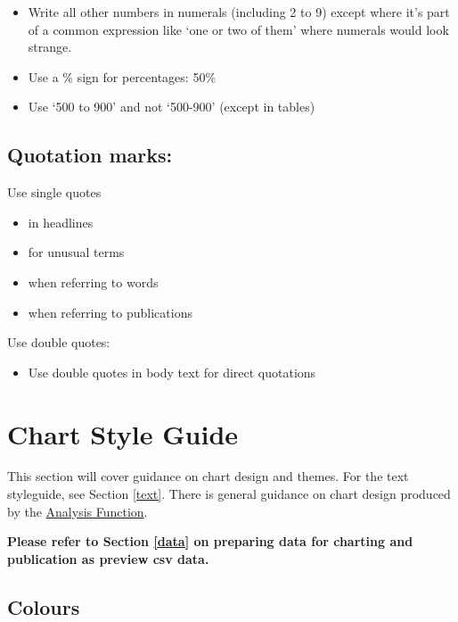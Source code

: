 \documentclass[
]{book}
\providecommand{\tightlist}{%
  \setlength{\itemsep}{0pt}\setlength{\parskip}{0pt}}
\begin{document}
\begin{itemize}
\tightlist
\item
  Write all other numbers in numerals (including 2 to 9) except where it's part of a common expression like `one or two of them' where numerals would look strange.
\item
  Use a \% sign for percentages: 50\%
\item
  Use `500 to 900' and not `500-900' (except in tables)
\end{itemize}

\hypertarget{quotation-marks}{%
\section{Quotation marks:}\label{quotation-marks}}

Use single quotes

\begin{itemize}
\tightlist
\item
  in headlines
\item
  for unusual terms
\item
  when referring to words
\item
  when referring to publications
\end{itemize}

Use double quotes:

\begin{itemize}
\tightlist
\item
  Use double quotes in body text for direct quotations
\end{itemize}

\hypertarget{chart}{%
\chapter{Chart Style Guide}\label{chart}}

This section will cover guidance on chart design and themes. For the text
styleguide, see Section \ref{text}. There is general guidance on chart design
produced by the \href{https://analysisfunction.civilservice.gov.uk/policy-store/data-visualisation-charts/}{Analysis Function}.

\textbf{Please refer to Section \ref{data} on preparing data for charting and publication as preview csv data.}

\hypertarget{colours}{%
\section{Colours}\label{colours}}
\end{document}
